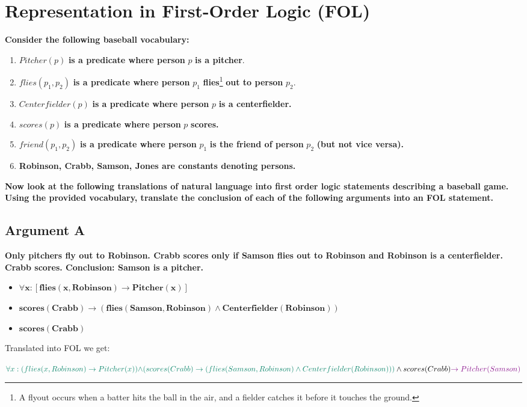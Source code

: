\section{Representation in First-Order Logic (FOL)}
\begin{large}
    \textbf{Consider the following baseball vocabulary:}
    \begin{enumerate}
        \item $Pitcher(p)$ \textbf{is a predicate where person} $p$ \textbf{is a pitcher}.
        \item $flies(p_1, p_2)$ \textbf{is a predicate where person} $p_1$ \textbf{flies}\footnote{A flyout occurs when a batter hits the ball in the air, and a fielder catches it before it touches the ground.} \textbf{ out to person }$p_2$.
        \item $Centerfielder(p)$ \textbf{is a predicate where person} $p$ \textbf{is a centerfielder.}
        \item $scores(p)$ \textbf{is a predicate where person} $p$\textbf{ scores.}
        \item $friend(p_1, p_2)$ \textbf{is a predicate where person }$p_1$\textbf{ is the friend of person} $p_2$ \textbf{(but not vice versa).}
        \item \textbf{Robinson, Crabb, Samson, Jones are constants denoting persons.}
    \end{enumerate}
    \textbf{Now look at the following translations of natural language into first order logic statements describing
        a baseball game. Using the provided vocabulary, translate the conclusion of each of the
        following arguments into an FOL statement.}
\end{large}

\subsection{Argument A}
\begin{large}
    \textbf{Only pitchers fly out to Robinson. Crabb scores only if Samson flies out to Robinson and Robinson is a
        centerfielder. Crabb scores.
        Conclusion: Samson is a pitcher.}\
    \begin{itemize}
        \item $\mathbf{\forall x : [flies(x, Robinson) \rightarrow Pitcher(x)]}$
        \item $\mathbf{scores(Crabb) \rightarrow (flies(Samson, Robinson) \land Centerfielder(Robinson))}$
        \item $\mathbf{scores(Crabb)}$
    \end{itemize}

    Translated into FOL we get:

    $\textcolor{PineGreen}{\forall x : (flies(x, Robinson) \rightarrow Pitcher(x))} \\
    \textcolor{PineGreen}{\land (scores(Crabb) \rightarrow (flies(Samson, Robinson) \land Centerfielder(Robinson)))} \\
        \land scores(Crabb) \\
        \textcolor{Plum}{\rightarrow Pitcher(Samson)}$
\end{large}


